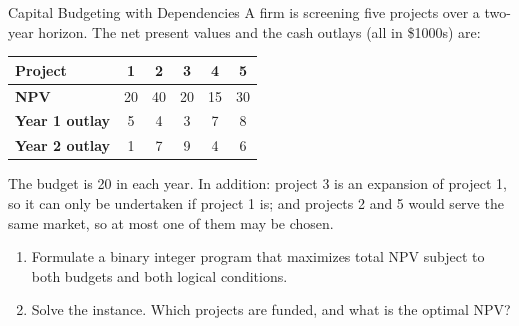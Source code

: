 \begin{ex}{Capital Budgeting with Dependencies}{}
\label{ex:capital-dependencies}
 A firm is screening five projects over a two-year horizon.  The net present values and the cash outlays (all in \$1000s) are:

\begin{center}
\begin{tabular}{l|c|c|c|c|c}
\textbf{Project} & 1 & 2 & 3 & 4 & 5 \\
\hline
\textbf{NPV} & 20 & 40 & 20 & 15 & 30 \\
\textbf{Year 1 outlay} & 5 & 4 & 3 & 7 & 8 \\
\textbf{Year 2 outlay} & 1 & 7 & 9 & 4 & 6 \\
\end{tabular}
\par{}\label{tab:integerProgrammingFormulations-book1-tab05}%

\end{center}

The budget is 20 in each year.  In addition: project 3 is an expansion of project 1, so it can only be undertaken if project 1 is; and projects 2 and 5 would serve the same market, so at most one of them may be chosen.
\begin{enumerate}
\item Formulate a binary integer program that maximizes total NPV subject to both budgets and both logical conditions.
\item Solve the instance.  Which projects are funded, and what is the optimal NPV?
\end{enumerate}
\exrefs{\S\ref{sec:capital-budgeting}, \S\ref{sec:modeling-tricks}}
\end{ex}


